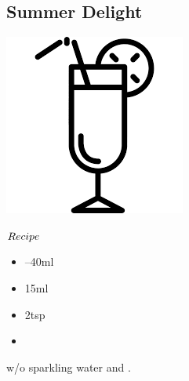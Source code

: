 \subsection{Summer Delight}
\vspace{-7.4mm}
\hspace{45mm}
\includegraphics[scale=.07]{cocktail_glass_tall.png}
\vspace{2.5mm}
\begin{itembox}[l]{\boldmath $Recipe$}
\begin{itemize}
\setlength{\parskip}{0cm}
\setlength{\itemsep}{0cm}
\item {}--40ml
\item \gs 15ml
\item \gumsyrup 2tsp
\item \soda
\end{itemize}
\vspace{-4mm}
\shake w/o sparkling water and \build
\hspace{-1mm}.
\end{itembox}
